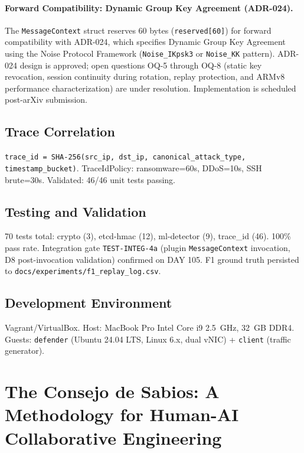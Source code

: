 \documentclass[11pt,a4paper]{article}
\begin{document}
    \paragraph{Forward Compatibility: Dynamic Group Key Agreement (ADR-024).}
    The \texttt{MessageContext} struct reserves 60 bytes (\texttt{reserved[60]}) for forward
    compatibility with ADR-024, which specifies Dynamic Group Key Agreement using the Noise
    Protocol Framework (\texttt{Noise\_IKpsk3} or \texttt{Noise\_KK} pattern). ADR-024 design
    is approved; open questions OQ-5 through OQ-8 (static key revocation, session continuity
    during rotation, replay protection, and ARMv8 performance characterization) are under
    resolution. Implementation is scheduled post-arXiv submission.

    \subsection{Trace Correlation}

    \texttt{trace\_id = SHA-256(src\_ip, dst\_ip, canonical\_attack\_type, timestamp\_bucket)}.
    TraceIdPolicy: ransomware=60s, DDoS=10s, SSH brute=30s. Validated: 46/46 unit tests passing.

    \subsection{Testing and Validation}

    70 tests total: crypto (3), etcd-hmac (12), ml-detector (9), trace\_id (46). 100\% pass
    rate. Integration gate \texttt{TEST-INTEG-4a} (plugin \texttt{MessageContext} invocation,
    D8 post-invocation validation) confirmed on DAY 105.
    F1 ground truth persisted to \texttt{docs/experiments/f1\_replay\_log.csv}.

    \subsection{Development Environment}

    Vagrant/VirtualBox. Host: MacBook Pro Intel Core i9 2.5~GHz, 32~GB DDR4. Guests: \texttt{defender} (Ubuntu 24.04
    LTS, Linux 6.x, dual vNIC) + \texttt{client} (traffic generator).

    \section{The Consejo de Sabios: A Methodology for Human-AI Collaborative Engineering}
    \label{sec:consejo}
\end{document}
